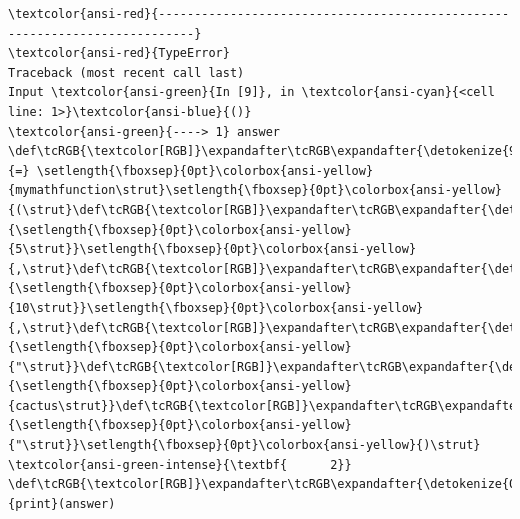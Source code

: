     \begin{Verbatim}[commandchars=\\\{\}, frame=single, framerule=2mm, rulecolor=\color{outerrorbackground}]
\textcolor{ansi-red}{---------------------------------------------------------------------------}
\textcolor{ansi-red}{TypeError}                                 Traceback (most recent call last)
Input \textcolor{ansi-green}{In [9]}, in \textcolor{ansi-cyan}{<cell line: 1>}\textcolor{ansi-blue}{()}
\textcolor{ansi-green}{----> 1} answer \def\tcRGB{\textcolor[RGB]}\expandafter\tcRGB\expandafter{\detokenize{98,98,98}}{=} \setlength{\fboxsep}{0pt}\colorbox{ansi-yellow}{mymathfunction\strut}\setlength{\fboxsep}{0pt}\colorbox{ansi-yellow}{(\strut}\def\tcRGB{\textcolor[RGB]}\expandafter\tcRGB\expandafter{\detokenize{98,98,98}}{\setlength{\fboxsep}{0pt}\colorbox{ansi-yellow}{5\strut}}\setlength{\fboxsep}{0pt}\colorbox{ansi-yellow}{,\strut}\def\tcRGB{\textcolor[RGB]}\expandafter\tcRGB\expandafter{\detokenize{98,98,98}}{\setlength{\fboxsep}{0pt}\colorbox{ansi-yellow}{10\strut}}\setlength{\fboxsep}{0pt}\colorbox{ansi-yellow}{,\strut}\def\tcRGB{\textcolor[RGB]}\expandafter\tcRGB\expandafter{\detokenize{175,0,0}}{\setlength{\fboxsep}{0pt}\colorbox{ansi-yellow}{"\strut}}\def\tcRGB{\textcolor[RGB]}\expandafter\tcRGB\expandafter{\detokenize{175,0,0}}{\setlength{\fboxsep}{0pt}\colorbox{ansi-yellow}{cactus\strut}}\def\tcRGB{\textcolor[RGB]}\expandafter\tcRGB\expandafter{\detokenize{175,0,0}}{\setlength{\fboxsep}{0pt}\colorbox{ansi-yellow}{"\strut}}\setlength{\fboxsep}{0pt}\colorbox{ansi-yellow}{)\strut}
\textcolor{ansi-green-intense}{\textbf{      2}} \def\tcRGB{\textcolor[RGB]}\expandafter\tcRGB\expandafter{\detokenize{0,135,0}}{print}(answer)


\end{Verbatim}
